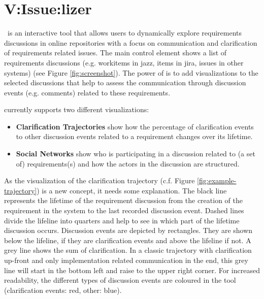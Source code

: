 \section{V:Issue:lizer}
\viss\ is an interactive tool that allows users to dynamically explore requirements discussions in online repositories with a focus on communication and clarification of requirements related issues.
The main control element shows a list of requirements discussions (e.g. workitems in jazz, items in jira, issues in other systems) (see Figure \ref{fig:screenshot}).
The power of \viss is to add visualizations to the selected discussions that help to assess the communication through discussion events (e.g. comments) related to these requirements.

\viss currently supports two different visualizations: 
\begin{itemize}
\item \textbf{Clarification Trajectories} show how the percentage of clarification events to other discussion events related to a requirement changes over its lifetime.
\item \textbf{Social Networks} show who is participating in a discussion related to (a set of) requirements(s) and how the actors in the discussion are structured. 
\end{itemize} 

As the visualization of the clarification trajectory (c.f. Figure \ref{fig:example-trajectory}) is a new concept, it needs some explanation.
The black line represents the lifetime of the requirement discussion from the creation of the requirement in the system to the last recorded discussion event.
Dashed lines divide the lifeline into quarters and help to see in which part of the lifetime discussion occurs.
Discussion events are depicted by rectangles.
They are shown below the lifeline, if they are clarification events and above the lifeline if not.
A grey line shows the sum of clarification.
In a classic trajectory with clarification up-front and only implementation related communication in the end, this grey line will start in the bottom left and raise to the upper right corner.
For increased readability, the different types of discussion events are coloured in the tool (clarification events: red, other: blue).